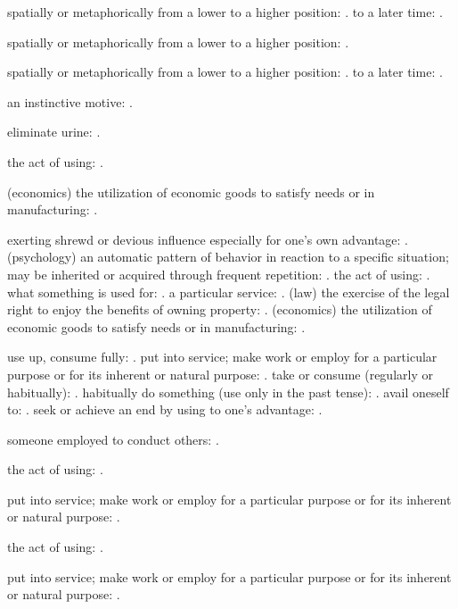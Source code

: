   spatially or metaphorically from a lower to a higher position: . to a later time: .

  spatially or metaphorically from a lower to a higher position: .

  spatially or metaphorically from a lower to a higher position: . to a later time: .

  an instinctive motive: .

  eliminate urine: .

  the act of using: .

  (economics) the utilization of economic goods to satisfy needs or in manufacturing: .

  exerting shrewd or devious influence especially for one's own advantage: . (psychology) an automatic pattern of behavior in reaction to a specific situation; may be inherited or acquired through frequent repetition: . the act of using: . what something is used for: . a particular service: . (law) the exercise of the legal right to enjoy the benefits of owning property: . (economics) the utilization of economic goods to satisfy needs or in manufacturing: .

  use up, consume fully: . put into service; make work or employ for a particular purpose or for its inherent or natural purpose: . take or consume (regularly or habitually): . habitually do something (use only in the past tense): . avail oneself to: . seek or achieve an end by using to one's advantage: .

  someone employed to conduct others: .

  the act of using: .

  put into service; make work or employ for a particular purpose or for its inherent or natural purpose: .

  the act of using: .

  put into service; make work or employ for a particular purpose or for its inherent or natural purpose: .

